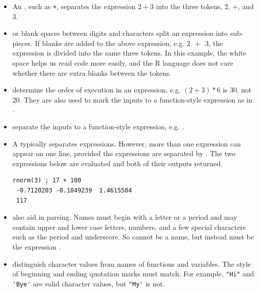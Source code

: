 \begin{itemize}
\item An , such as \verb-+-, separates the
                                            expression $2+3$ into the
                                            three tokens, $2$, $+$,
                                            and $3$.
\item {} or blank spaces between digits and characters
  split an expression into sub-pieces.  If blanks are added to the
  above expression, e.g. $2~~+~~3$, the expression is divided into the
  same three tokens.  In this example, the white space helps us read
  code more easily, and the R language does not care whether there are
  extra blanks between the tokens.
\item {} determine the order of execution in an
  expression, e.g. $(2+3)*6$ is $30$, not $20$. They are also used to
  mark the inputs to a function-style expression as in
  .
\item {} separate the inputs to a function-style expression,
  e.g.  .
\item A  typically separates expressions.  However, more
  than one expression can appear on one line, provided the expressions
  are separated by . The two expressions below are
  evaluated and both of their outputs returned.
\begin{verbatim}
rnorm(3) ; 17 + 100
 -0.7120203 -0.1849239  1.4615504
 117
\end{verbatim}
\item {} also aid in parsing.  Names must begin
  with a letter or a period and may contain upper and lower case
  letters, numbers, and a few special characters such as the period
  and underscore.  So  cannot be a name, but instead
  must be the expression .
\item {} distinguish character values from names of
  functions and variables.  The style of beginning and ending quotation marks
  must match.  For example, \verb+"Hi"+ and \verb+'Bye'+ are valid
  character values, but \verb+"My'+ is not.
\end{itemize}

